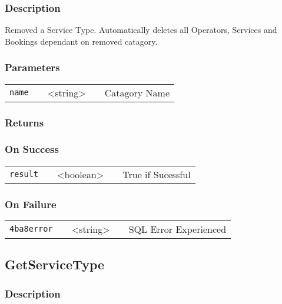 \documentclass[a4paper,12pt]{article}
\begin{document}
\subsubsection{Description}

Removed a Service Type. Automatically deletes all Operators,
Services and Bookings dependant on removed catagory.

\subsubsection{Parameters}

\begin{tabular}{ccccc}
\verb!name! & \vspace{15mm} & <string> & \vspace{15mm} & Catagory Name \\
\end{tabular}

\subsubsection{Returns}

\subsubsection{On Success}

\begin{tabular}{ccccc}
\verb!result! & \vspace{15mm} & <boolean> & \vspace{15mm} & True if Sucessful \\
\end{tabular}

\subsubsection{On Failure}

\begin{tabular}{ccccc}
\verb!4ba8error! & \vspace{15mm} & <string> & \vspace{15mm} & SQL Error Experienced \\
\end{tabular}


\subsection{GetServiceType}

\subsubsection{Description}
\end{document}
